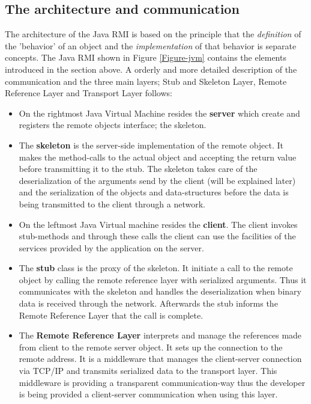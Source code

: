 \documentclass[Main]{subfiles}
\begin{document}
\subsection{The architecture and communication}
The architecture of the Java RMI is based on the principle that the \textit{definition} of the 'behavior' of an object and the \textit{implementation} of that behavior is separate concepts. The Java RMI shown in Figure \ref{Figure-jvm} contains the elements introduced in the section above. A orderly and more detailed description of the communication and the three main layers; Stub and Skeleton Layer, Remote Reference Layer and Transport Layer follows:
\begin{itemize}

\item On the rightmost Java Virtual Machine resides the \textbf{server} which create and registers the remote objects interface; the skeleton.

\item The \textbf{skeleton} is the server-side implementation of the remote object. It makes the method-calls to the actual object and accepting the return value before transmitting it to the stub. The skeleton takes care of the deserialization of the arguments send by the client (will be explained later) and the serialization of the objects and data-structures before the data is being transmitted to the client through a network.

\item On the leftmost Java Virtual machine resides the \textbf{client}. The client invokes stub-methods and through these calls the client can use the facilities of the services provided by the application on the server.

\item The \textbf{stub} class is the proxy of the skeleton. It initiate a call to the remote object by calling the remote reference layer with serialized arguments. Thus it communicates with the skeleton and handles the deserialization when binary data is received through the network. Afterwards the stub informs the Remote Reference Layer that the call is complete.

\item The \textbf{Remote Reference Layer} interprets and manage the references made from client to the remote server object. It sets up the connection to the remote address. It is a middleware that manages the client-server connection via TCP/IP and transmits serialized data to the transport layer. This middleware is providing a transparent communication-way thus the developer is being provided a client-server communication when using this layer.


\end{itemize}
\end{document}
